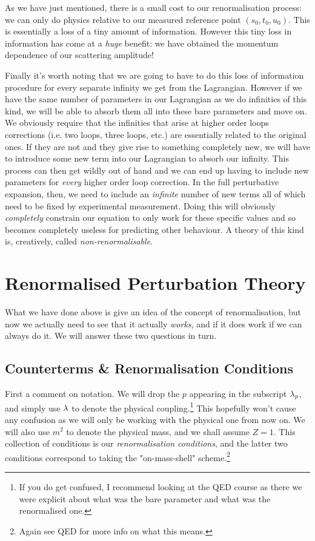 As we have just mentioned, there is a small cost to our renormalisation process: we can only do physics relative to our measured reference point $(s_0,t_0,u_0)$. This is essentially a loss of a tiny amount of information. However this tiny loss in information has come at a \textit{huge} benefit: we have obtained the momentum dependence of our scattering amplitude! 

Finally it's worth noting that we are going to have to do this loss of information procedure for every separate infinity we get from the Lagrangian. However if we have the same number of parameters in our Lagrangian as we do infinities of this kind, we will be able to absorb them all into these bare parameters and move on. We obviously require that the infinities that arise at higher order loops corrections (i.e. two loops, three loops, etc.) are essentially related to the original ones. If they are not and they give rise to something completely new, we will have to introduce some new term into our Lagrangian to absorb our infinity. This process can then get wildly out of hand and we can end up having to include new parameters for \textit{every} higher order loop correction. In the full perturbative expansion, then, we need to include an \textit{infinite} number of new terms all of which need to be fixed by experimental measurement. Doing this will obviously \textit{completely} constrain our equation to only work for these specific values and so becomes completely useless for predicting other behaviour. A theory of this kind is, creatively, called \textit{non-renormalisable}. 

\section{Renormalised Perturbation Theory}

What we have done above is give an idea of the concept of renormalisation, but now we actually need to see that it actually \textit{works}, and if it does work if we can always do it. We will answer these two questions in turn. 

\subsection{Counterterms \& Renormalisation Conditions}

First a comment on notation. We will drop the $p$ appearing in the subscript $\lambda_p$, and simply use $\lambda$ to denote the physical coupling.\footnote{If you do get confused, I recommend looking at the QED course as there we were explicit about what was the bare parameter and what was the renormalised one.} This hopefully won't cause any confusion as we will only be working with the physical one from now on. We will also use $m^2$ to denote the physical mass, and we shall assume $Z=1$. This collection of conditions is our \textit{renormalisation conditions}, and the latter two conditions correspond to taking the "on-mass-shell" scheme.\footnote{Again see QED for more info on what this means.}

